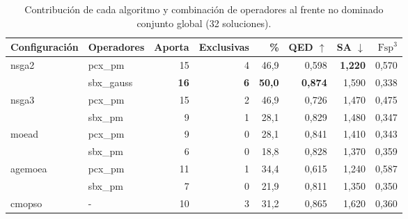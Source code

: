 \begin{table}[!htbp]
\centering
\caption{Contribución de cada algoritmo y combinación de operadores al frente no dominado conjunto global (32 soluciones).}
\label{tab:contribucion_pool}
\begin{tabular}{llrrrrrr}
\toprule
Configuración & Operadores & Aporta & Exclusivas & \% & QED $\uparrow$ & SA $\downarrow$ & $\text{Fsp}^3$ \\
\midrule
\multirow{2}{*}{\acrshort{nsga2}} & pcx\_pm & 15 & 4 & 46,9 & 0,598 & \textbf{1,220} & 0,570 \\
 & sbx\_gauss & \textbf{16} & \textbf{6} & \textbf{50,0} & \textbf{0,874} & 1,590 & 0,338 \\
\midrule
\multirow{2}{*}{\acrshort{nsga3}} & pcx\_pm & 15 & 2 & 46,9 & 0,726 & 1,470 & 0,475 \\
 & sbx\_pm & 9 & 1 & 28,1 & 0,829 & 1,480 & 0,347 \\
\midrule
\multirow{2}{*}{\acrshort{moead}} & pcx\_pm & 9 & 0 & 28,1 & 0,841 & 1,410 & 0,343 \\
 & sbx\_pm & 6 & 0 & 18,8 & 0,828 & 1,370 & 0,359 \\
\midrule
\multirow{2}{*}{\acrshort{agemoea}} & pcx\_pm & 11 & 1 & 34,4 & 0,615 & 1,240 & 0,587 \\
 & sbx\_pm & 7 & 0 & 21,9 & 0,811 & 1,350 & 0,350 \\
\midrule
\acrshort{cmopso} & - & 10 & 3 & 31,2 & 0,865 & 1,620 & 0,360 \\
\bottomrule
\end{tabular}
\end{table}
